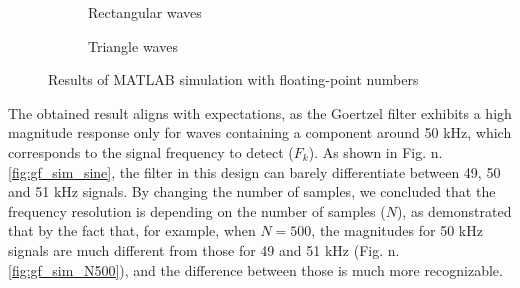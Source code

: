 \begin{figure}[H]
\begin{subfigure}[b]{0.6\textwidth}
        \caption{Rectangular waves}
    \end{subfigure}
    \hfill
    \begin{subfigure}[b]{0.35\textwidth}
        \caption{Triangle waves}
    \end{subfigure}
    
    \caption{Results of MATLAB simulation with floating-point numbers}
    \label{fig:gf_sim}
\end{figure}

The obtained result aligns with expectations, as the Goertzel filter exhibits a high magnitude response only for waves containing a component around 50 kHz, which corresponds to the signal frequency to detect ($F_k$).
As shown in Fig. n. \ref{fig:gf_sim_sine}, the filter in this design can barely differentiate between 49, 50 and 51 kHz signals. By changing the number of samples, we concluded that the frequency resolution is depending on the number of samples ($N$), as demonstrated that by the fact that, for example, when $N = 500$, the magnitudes for 50 kHz signals are much different from those for 49 and 51 kHz (Fig. n. \ref{fig:gf_sim_N500}), and the difference between those is much more recognizable.

